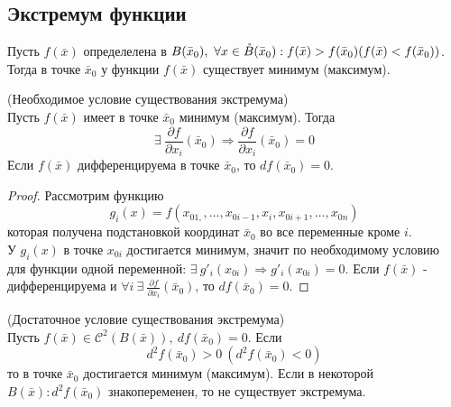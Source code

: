 \subsection{Экстремум функции}
\begin{definition}
    Пусть $f(\bar{x})$ определелена в $B(\bar{x}_0),\ \forall x\in \mathring{B}(\bar{x}_0): f(\bar{x})>f(\bar{x}_0)\\ (f(\bar{x})<f(\bar{x}_0))$. Тогда в точке $\bar{x}_0$ у функции $f(\bar{x})$ существует минимум (максимум).
\end{definition} 
\begin{theorem} (Необходимое условие существования экстремума)\\
    Пусть $f(\bar{x})$ имеет в точке $\bar{x}_0$ минимум (максимум). Тогда
    \[\exists\ \frac{\partial {f}}{\partial {x_i}}(\bar{x}_0) \Rightarrow \frac{\partial {f}}{\partial {x_i}}(\bar{x}_0)=0\]
    Если $f(\bar{x})$ дифференцируема в точке $\bar{x}_0$, то $df(\bar{x}_0)=0$. 
\end{theorem} 
\begin{proof}
    Рассмотрим функцию\
    \[g_i(x)=f(x_{01,},\dots,x_{0i-1},x_i,x_{0i+1},\dots,x_{0n})\]
    которая получена подстановкой координат $\bar{x}_0$ во все переменные кроме $i$.\\
    У $g_i(x)$ в точке $x_{0i}$ достигается минимум, значит по необходимому условию для функции одной переменной: $\exists\ g'_i(x_{0i}) \Rightarrow g'_i(x_{0i})=0$. Если $f(\bar{x})$ - дифференцируема и $\forall i\ \exists\ \frac{\partial {f}}{\partial {x_i}}(\bar{x}_0)$, то $df(\bar{x}_0)=0$.
\end{proof} 
\begin{theorem} (Достаточное условие существования экстремума)\\
    Пусть $f(\bar{x})\in \mathcal{C}^2(B(\bar{x})),\ df(\bar{x}_0)=0$. Если 
    \[d^2f(\bar{x}_0)>0\ (d^2f(\bar{x}_0)<0)\] 
    то в точке $\bar{x}_0$ достигается минимум (максимум). Если в некоторой $B(\bar{x}): d^2f(\bar{x}_0)$ знакопеременен, то не существует экстремума.
\end{theorem} 
